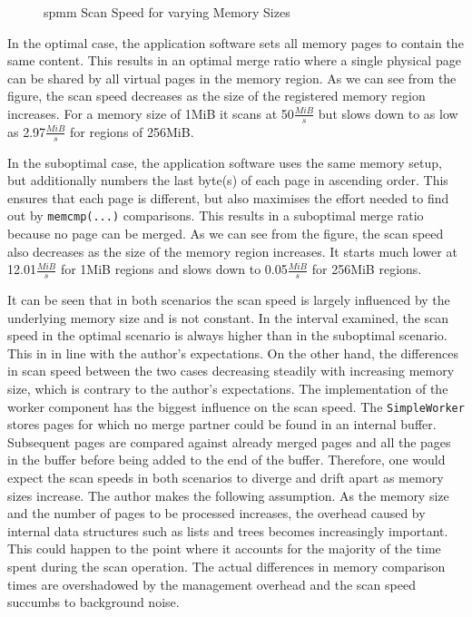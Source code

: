 \begin{figure}
  \centering
  
  \caption{\acs{spmm} Scan Speed for varying Memory Sizes}
  \label{fig:scan-speed}
\end{figure}

In the optimal case, the application software sets all memory pages to contain the same content.
This results in an optimal merge ratio where a single physical page can be shared by all virtual pages in the memory region.
As we can see from the figure, the scan speed decreases as the size of the registered memory region increases.
For a memory size of 1MiB it scans at 50$\frac{MiB}{s}$ but slows down to as low as 2.97$\frac{MiB}{s}$ for regions of 256MiB.

In the suboptimal case, the application software uses the same memory setup, but additionally numbers the last byte(s) of each page in ascending order.
This ensures that each page is different, but also maximises the effort needed to find out by \texttt{memcmp(...)} comparisons.
This results in a suboptimal merge ratio because no page can be merged.
As we can see from the figure, the scan speed also decreases as the size of the memory region increases.
It starts much lower at 12.01$\frac{MiB}{s}$ for 1MiB regions and slows down to 0.05$\frac{MiB}{s}$ for 256MiB regions.

It can be seen that in both scenarios the scan speed is largely influenced by the underlying memory size and is not constant.
In the interval examined, the scan speed in the optimal scenario is always higher than in the suboptimal scenario.
This in in line with the author's expectations.
On the other hand, the differences in scan speed between the two cases decreasing steadily with increasing memory size, which is contrary to the author's expectations.
The implementation of the worker component has the biggest influence on the scan speed.
The \texttt{Simple\-Worker} stores pages for which no merge partner could be found in an internal buffer.
Subsequent pages are compared against already merged pages and all the pages in the buffer before being added to the end of the buffer.
Therefore, one would expect the scan speeds in both scenarios to diverge and drift apart as memory sizes increase.
The author makes the following assumption.
As the memory size and the number of pages to be processed increases, the overhead caused by internal data structures such as lists and trees becomes increasingly important.
This could happen to the point where it accounts for the majority of the time spent during the scan operation.
The actual differences in memory comparison times are overshadowed by the management overhead and the scan speed succumbs to background noise.

